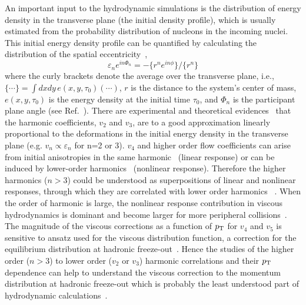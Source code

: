 \documentclass[ALICE,manyauthors]{cernphprep}
\begin{document}
An important input to the hydrodynamic simulations is the distribution of energy density in the transverse plane (the initial density profile), which is usually estimated from the probability distribution of nucleons in the incoming nuclei.
This initial energy density profile can be quantified by calculating the distribution of the spatial eccentricity~\cite{Alver:2010gr},
\begin{equation}
 \varepsilon_{n} e^{in\Phi_{n}} = -\{r^n e^{in\phi}\}/ \{r^n\} 
  \label{eq:eccentricities}
\end{equation}
where the curly brackets denote the average over the transverse plane, i.e., $\{\cdots\} = \int dxdy\, e(x,y,\tau_0) (\cdots)$, $r$ is the distance to the system's center of mass, $e(x,y,\tau_0)$ is the energy density at the initial time $\tau_0$, and $\Phi_{n}$ is the participant plane angle (see Ref.~\cite{Teaney:2010vd,Niemi:2015qia}).
There are experimental and theoretical evidences~\cite{Alver:2010gr,Qiu:2011iv} that the harmonic coefficients, $v_2$ and $v_3$, are to a good approximation linearly proportional to the deformations in the initial energy density in the transverse plane (e.g. $v_n \propto \varepsilon_n$ for n=2 or 3).
$v_4$ and higher order flow coefficients can arise from initial anisotropies in the same harmonic~\cite{Alver:2010gr,Teaney:2010vd,Gubser:2010ui,Hatta:2014jva} (linear response) or can be induced by lower-order harmonics~\cite{Bravina:2013xla,Bravina:2013ora} (nonlinear response).
Therefore the higher harmonics ($n>3$) could be understood as superpositions of linear and nonlinear responses, through which they are correlated with lower order harmonics ~\cite{Teaney:2012ke,Bravina:2013ora,Gubser:2010ui,Hatta:2014jva}. When the order of harmonic is large, the nonlinear response contribution in viscous hydrodynamics is dominant and become larger for more peripheral collisions~\cite{Teaney:2012ke,Bravina:2013ora}.
The magnitude of the viscous corrections as a function of $p_{\rm T}$ for $v_4$ and $v_5$ is sensitive to ansatz used for the viscous distribution function, a correction for the equilibrium distribution at hadronic freeze-out~\cite{Luzum:2010ad,Teaney:2012ke}.
Hence the studies of the higher order ($n>3$) to lower order ($v_2$ or $v_3$) harmonic correlations and their $p_{\rm T}$ dependence can help to understand the viscous correction to the momentum distribution at hadronic freeze-out which is probably the least understood part of hydrodynamic calculations~\cite{Teaney:2012ke,Niemi:2015qia}.
\end{document}
